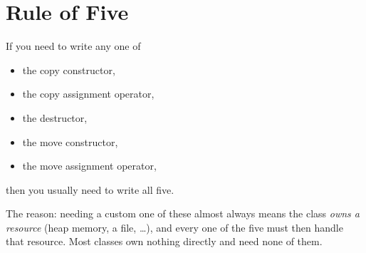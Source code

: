 \section{Rule of Five}
\begin{important}
If you need to write any one of
\begin{itemize}
  \item the copy constructor,
  \item the copy assignment operator,
  \item the destructor,
  \item the move constructor,
  \item the move assignment operator,
\end{itemize}
then you usually need to write all five.
\end{important}
The reason: needing a custom one of these almost always means the class
\emph{owns a resource} (heap memory, a file, \dots), and every one of the five
must then handle that resource. Most classes own nothing directly and need none
of them.

